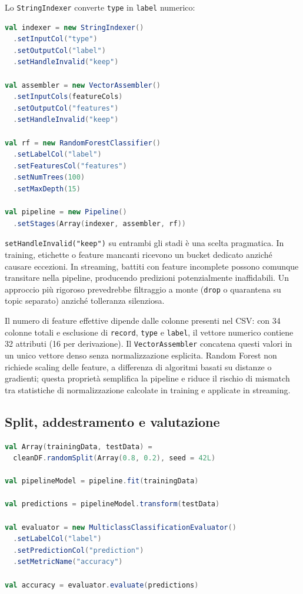 Lo \texttt{StringIndexer} converte \texttt{type} in \texttt{label} numerico:

\begin{lstlisting}[language=Scala,caption={Pipeline ML: indicizzazione, assemblaggio, classificazione.},label={lst:ml-pipeline}]
val indexer = new StringIndexer()
  .setInputCol("type")
  .setOutputCol("label")
  .setHandleInvalid("keep")

val assembler = new VectorAssembler()
  .setInputCols(featureCols)
  .setOutputCol("features")
  .setHandleInvalid("keep")

val rf = new RandomForestClassifier()
  .setLabelCol("label")
  .setFeaturesCol("features")
  .setNumTrees(100)
  .setMaxDepth(15)

val pipeline = new Pipeline()
  .setStages(Array(indexer, assembler, rf))
\end{lstlisting}

\texttt{setHandleInvalid("keep")} su entrambi gli stadi è una scelta pragmatica.
In training, etichette o feature mancanti ricevono un bucket dedicato anziché causare eccezioni.
In streaming, battiti con feature incomplete possono comunque transitare nella pipeline, producendo predizioni potenzialmente inaffidabili.
Un approccio più rigoroso prevedrebbe filtraggio a monte (\texttt{drop} o quarantena su topic separato) anziché tolleranza silenziosa.

Il numero di feature effettive dipende dalle colonne presenti nel CSV: con 34 colonne totali e esclusione di \texttt{record}, \texttt{type} e \texttt{label}, il vettore numerico contiene 32 attributi (16 per derivazione).
Il \texttt{VectorAssembler} concatena questi valori in un unico vettore denso senza normalizzazione esplicita.
Random Forest non richiede scaling delle feature, a differenza di algoritmi basati su distanze o gradienti; questa proprietà semplifica la pipeline e riduce il rischio di mismatch tra statistiche di normalizzazione calcolate in training e applicate in streaming.

\subsection{Split, addestramento e valutazione}

\begin{lstlisting}[language=Scala,caption={Split train/test e valutazione.},label={lst:train-eval}]
val Array(trainingData, testData) =
  cleanDF.randomSplit(Array(0.8, 0.2), seed = 42L)

val pipelineModel = pipeline.fit(trainingData)

val predictions = pipelineModel.transform(testData)

val evaluator = new MulticlassClassificationEvaluator()
  .setLabelCol("label")
  .setPredictionCol("prediction")
  .setMetricName("accuracy")

val accuracy = evaluator.evaluate(predictions)
\end{lstlisting}

